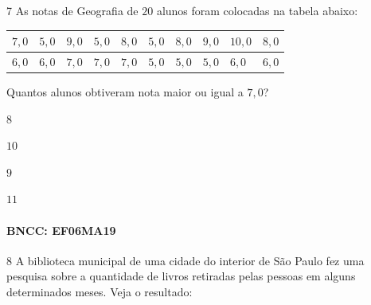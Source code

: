 {%

\num{7}  As notas de Geografia de $20$ alunos foram colocadas na tabela abaixo:


\begin{longtable}[]{@{}llllllllll@{}}
\toprule
$7,0$ & $5,0$ & $9,0$ & $5,0$ & $8,0$ & $5,0$ & $8,0$ & $9,0$ & $10,0$ &
$8,0$\tabularnewline
\midrule
\endhead
$6,0$ & $6,0$ & $7,0$ & $7,0$ & $7,0$ & $5,0$ & $5,0$ & $5,0$ & $6,0$ & $6,0$\tabularnewline
\bottomrule
\end{longtable}

Quantos alunos obtiveram nota maior ou igual a $7,0$?

\begin{escolha}
\item $8$
\item $10$
\item $9$
\item $11$
\end{escolha}

\paragraph{BNCC: EF06MA19}


\num{8}  A biblioteca municipal de uma cidade do interior de São Paulo fez uma
pesquisa sobre a quantidade de livros retiradas pelas pessoas em alguns
determinados meses. Veja o resultado:

}

